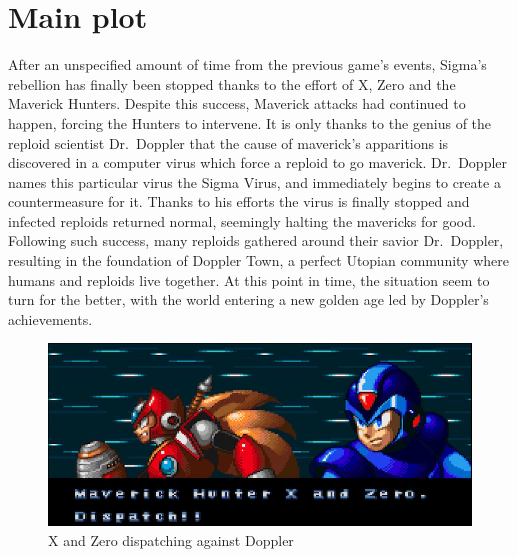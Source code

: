 \section{Main plot}
After an unspecified amount of time from the previous game's events, Sigma's rebellion has finally been stopped thanks to the effort of X, Zero and the Maverick Hunters. Despite this success, Maverick attacks had continued to happen, forcing the Hunters to intervene. It is only thanks to the genius of the reploid scientist Dr.~Doppler that the cause of maverick's apparitions is discovered in a computer virus which force a reploid to go maverick. Dr.~Doppler names this particular virus the Sigma Virus, and immediately begins to create a countermeasure for it. Thanks to his efforts the virus is  finally  stopped and infected reploids returned normal, seemingly halting the mavericks for good.  Following such success, many reploids gathered around their savior Dr.~Doppler, resulting in the foundation of Doppler Town, a perfect Utopian community where humans and reploids live together. At this point in time, the situation seem to turn for the better, with the world entering a new golden age led by Doppler's achievements.
\begin{figure}[htp]
	\centering
	\includegraphics[width=.6\linewidth]{figures/X3/Story_1.jpg}
	\caption{X and Zero dispatching against Doppler}
\end{figure}

